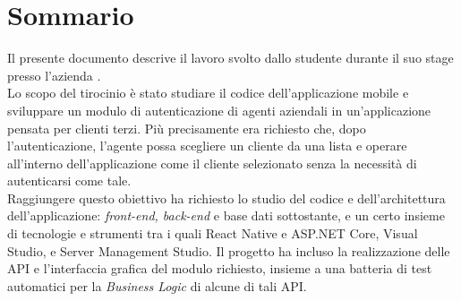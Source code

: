 \cleardoublepage
{}
{}
\begingroup
\let\clearpage\relax
\let\cleardoublepage\relax
\chapter*{Sommario}

Il presente documento descrive il lavoro svolto dallo studente {\myName} durante il suo stage presso l’azienda {\companyLong}.\\
Lo scopo del tirocinio è stato studiare il codice dell’applicazione mobile {\movi} e sviluppare un modulo di autenticazione di agenti aziendali 
in un'applicazione pensata per clienti terzi. Più precisamente era richiesto che, dopo l’autenticazione, l’agente possa scegliere un cliente da una 
lista e operare all’interno dell’applicazione come il cliente selezionato senza la necessità di autenticarsi come tale.\\
Raggiungere questo obiettivo ha richiesto lo studio del codice e dell’architettura dell’applicazione: \textit{front-end, back-end} e base dati 
sottostante, e un certo insieme di tecnologie e strumenti tra i quali React Native e ASP.NET Core, Visual Studio, e Server Management Studio. 
Il progetto ha incluso la realizzazione delle API e l’interfaccia grafica del modulo richiesto, insieme a una batteria di test automatici per la 
\textit{Business Logic} di alcune di tali API.


\endgroup
\vfill
